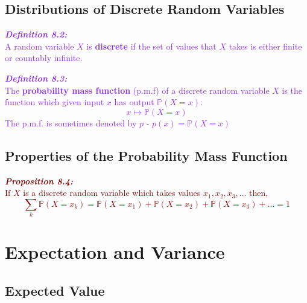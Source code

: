 \documentclass{report}
\newenvironment{cframed}[1][BlueViolet]
  {\begin{tcolorbox}[colframe=#1,colback=white]}
  {\end{tcolorbox}}
\newenvironment{cframedprop}[1][Maroon]
  {\begin{tcolorbox}[colframe=#1,colback=white]}
  {\end{tcolorbox}}
\begin{document}
\section{Distributions of Discrete Random Variables}

\begin{cframed}
    \textcolor{BlueViolet}{\textbf{\textit{Definition 8.2:}}\\
    A random variable $X$ is \textbf{discrete} if the set of values that $X$ takes is either finite or countably infinite.}
\end{cframed}

\begin{cframed}
    \textcolor{BlueViolet}{\textbf{\textit{Definition 8.3:}}\\
    The \textbf{probability mass function} (p.m.f) of a discrete random variable $X$ is the function which given input $x$ has output $\mathbb{P}(X = x)$:
    \begin{equation}
        x \mapsto \mathbb{P}(X = x)
    \end{equation}
    The p.m.f. is sometimes denoted by $p$ - $p(x) = \mathbb{P}(X = x)$}
\end{cframed}

\section{Properties of the Probability Mass Function}

\begin{cframedprop}
    \textcolor{Maroon}{\textbf{\textit{Proposition 8.4:}}\\
    If $X$ is a discrete random variable which takes values $x_1,x_2,x_3,...$ then,
    \begin{equation}
        \sum_{k} \mathbb{P}(X = x_k) = \mathbb{P}(X = x_1) + \mathbb{P}(X = x_2) + \mathbb{P}(X = x_3) + ... = 1
    \end{equation}}
\end{cframedprop}

\chapter{Expectation and Variance}
\section{Expected Value}
\end{document}

